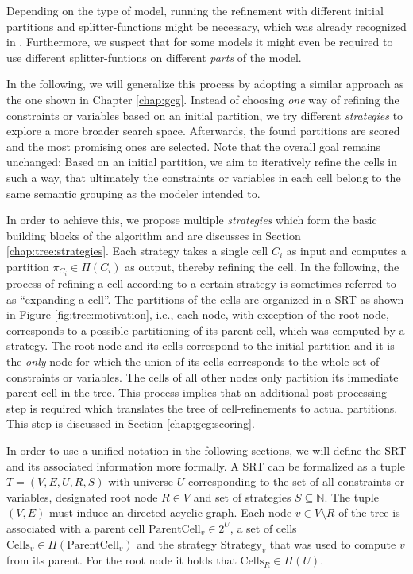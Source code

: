 		Depending on the type of model, running the refinement with different initial partitions and splitter-functions might be necessary, which was already recognized in \cite{salvagninDetectingSemanticGroups2016}.
		Furthermore, we suspect that for some models it might even be required to use different splitter-funtions on different \textit{parts} of the model.
		
		In the following, we will generalize this process by adopting a similar approach as the one shown in Chapter \ref{chap:gcg}. 
		Instead of choosing \textit{one} way of refining the constraints or variables based on an initial partition, we try different \textit{strategies} to explore a more broader search space.
		Afterwards, the found partitions are scored and the most promising ones are selected.
		Note that the overall goal remains unchanged: Based on an initial partition, we aim to iteratively refine the cells in such a way, that ultimately the constraints or variables in each cell belong to the same semantic grouping as the modeler intended to.
		
		In order to achieve this, we propose multiple \textit{strategies} which form the basic building blocks of the algorithm and are discusses in Section \ref{chap:tree:strategies}.
		Each strategy takes a single cell $C_i$ as input and computes a partition $\pi_{C_i} \in \Pi(C_i)$ as output, thereby refining the cell.
		In the following, the process of refining a cell according to a certain strategy is sometimes referred to as \enquote{expanding a cell}.
		The partitions of the cells are organized in a \acf{SRT} as shown in Figure \ref{fig:tree:motivation}, i.e., each node, with exception of the root node, corresponds to a possible partitioning of its parent cell, which was computed by a strategy.
		The root node and its cells correspond to the initial partition and it is the \textit{only} node for which the union of its cells corresponds to the whole set of constraints or variables. The cells of all other nodes only partition its immediate parent cell in the tree.
		This process implies that an additional post-processing step is required which translates the tree of cell-refinements to actual partitions. This step is discussed in Section \ref{chap:gcg:scoring}.
		
		In order to use a unified notation in the following sections, we will define the \ac{SRT} and its associated information more formally.
		A \ac{SRT} can be formalized as a tuple $T = (V, E, U, R, S)$ with universe $U$ corresponding to the set of all constraints or variables, designated root node $R \in V$ and set of strategies $S \subseteq \mathbb{N}$.
		The tuple $(V, E)$ must induce an directed acyclic graph.
		Each node $v \in V \setminus R$ of the tree is associated with a parent cell $\mathrm{ParentCell}_v \in 2^U$, a set of cells $\mathrm{Cells}_{v} \in \Pi(\mathrm{ParentCell}_v)$ and the strategy $\mathrm{Strategy}_v$ that was used to compute $v$ from its parent.
		For the root node it holds that $\mathrm{Cells}_R \in \Pi(U)$.
		
